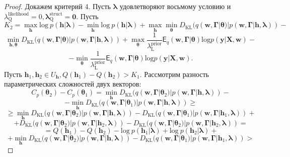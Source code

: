 \begin{proof}
Докажем критерий 4. 
Пусть $\boldsymbol{\lambda}$ удовлетворяют восьмому условию и $\lambda^{\text{likelihood}}_\text{Q} = 0, \boldsymbol{\lambda}^\text{struct}_\text{Q} = \mathbf{0}$.
Пусть 
\[
K_2 =  \max_{\mathbf{h}} \text{log}~p (\mathbf{h}|\boldsymbol{\lambda}) - \min_{\mathbf{h}} \text{log}~p (\mathbf{h}|\boldsymbol{\lambda})  + \max_{\mathbf{h}} \min_{\boldsymbol{\theta}} D_\text{KL}(q(\mathbf{w}, \boldsymbol{\Gamma}|\boldsymbol{\theta})|p(\mathbf{w}, \boldsymbol{\Gamma}|\mathbf{h}, \boldsymbol{\lambda})) -
\]
\[ \min_{\mathbf{h}, \boldsymbol{\theta}} D_\text{KL}(q(\mathbf{w}, \boldsymbol{\Gamma}|\boldsymbol{\theta})|p(\mathbf{w}, \boldsymbol{\Gamma}|\mathbf{h}, \boldsymbol{\lambda})) + \max_{\boldsymbol{\theta}}\frac{1}{\lambda^\text{prior}_\text{L}}\mathsf{E}_q(\mathbf{w}, \boldsymbol{\Gamma}|\boldsymbol{\theta}) \text{log} p(\mathbf{y}|\mathbf{X}, \mathbf{w})  - 
\]
\[
 - \min_{\boldsymbol{\theta}}\frac{1}{\lambda^\text{prior}_\text{L}}\mathsf{E}_q(\mathbf{w}, \boldsymbol{\Gamma}|\boldsymbol{\theta}) \text{log} p(\mathbf{y}|\mathbf{X}, \mathbf{w}).
\]
Пусть $\mathbf{h}_1, \mathbf{h}_2 \in U_\mathbf{h}, Q(\mathbf{h}_1)-Q(\mathbf{h}_2)>K_1$.
Рассмотрим разность параметрических сложностей двух векторов:
\[
C_p(\boldsymbol{\theta}_2)-C_p(\boldsymbol{\theta}_1) = \min_{\mathbf{h}} D_\text{KL}(q(\mathbf{w}, \boldsymbol{\Gamma}|\boldsymbol{\theta}_2)|p(\mathbf{w}, \boldsymbol{\Gamma}|\mathbf{h}, \boldsymbol{\lambda})) - 
\]
\[
-\min_{\mathbf{h}} D_\text{KL}(q(\mathbf{w}, \boldsymbol{\Gamma}|\boldsymbol{\theta}_1)|p(\mathbf{w}, \boldsymbol{\Gamma}|\mathbf{h}, \boldsymbol{\lambda})) \geq
\]
\[
\geq
\min_{\mathbf{h}} D_\text{KL}(q(\mathbf{w}, \boldsymbol{\Gamma}|\boldsymbol{\theta}_2)|p(\mathbf{w}, \boldsymbol{\Gamma}|\mathbf{h}, \boldsymbol{\lambda}))- D_\text{KL}(q(\mathbf{w}, \boldsymbol{\Gamma}|\boldsymbol{\theta}_1)|p(\mathbf{w}, \boldsymbol{\Gamma}|\mathbf{h}_1, \boldsymbol{\lambda})) +
\]
\[
+D_\text{KL}(q(\mathbf{w}, \boldsymbol{\Gamma}|\boldsymbol{\theta}_2)|p(\mathbf{w}, \boldsymbol{\Gamma}|\mathbf{h}_2, \boldsymbol{\lambda})) - D_\text{KL}(q(\mathbf{w}, \boldsymbol{\Gamma}|\boldsymbol{\theta}_2)|p(\mathbf{w}, \boldsymbol{\Gamma}|\mathbf{h}_2, \boldsymbol{\lambda})) =
\]
\[
= Q(\mathbf{h}_1)-Q(\mathbf{h}_2)-\text{log}~p (\mathbf{h}_1|\boldsymbol{\lambda})+\text{log}~p (\mathbf{h}_2|\boldsymbol{\lambda})+
\]
\[+\min_{\mathbf{h}} D_\text{KL}(q(\mathbf{w}, \boldsymbol{\Gamma}|\boldsymbol{\theta}_2)|p(\mathbf{w}, \boldsymbol{\Gamma}|\mathbf{h}, \boldsymbol{\lambda})) -  D_\text{KL}(q(\mathbf{w}, \boldsymbol{\Gamma}|\boldsymbol{\theta}_1)|p(\mathbf{w}, \boldsymbol{\Gamma}|\mathbf{h}_1, \boldsymbol{\lambda})) >
\]
\end{proof}
